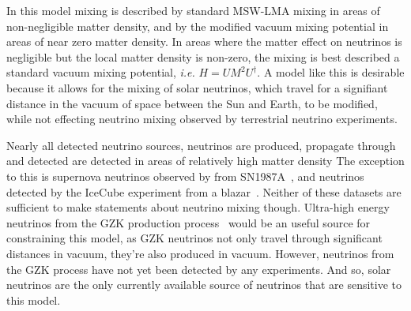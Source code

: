 In this model mixing is described by standard MSW-LMA mixing in areas of
non-negligible matter density, and by the modified vacuum mixing potential
in areas of near zero matter density.
In areas where the matter effect on neutrinos is negligible but the local
matter density is non-zero, the mixing is best described a standard
vacuum mixing potential, \textit{i.e.} $H = UM^{2}U^{\dagger}$.
A model like this is desirable because it allows for the mixing of solar neutrinos, which
travel for a signifiant distance in the vacuum of space between the Sun and Earth,
to be modified, while not effecting neutrino mixing observed by terrestrial neutrino experiments.

Nearly all detected neutrino sources, neutrinos are produced, propagate through
 and detected are detected in areas of relatively high matter density
The exception to this is supernova neutrinos observed by from SN1987A~\citep{kamiokande_sn, imb_sn,baksan_sn},
and neutrinos detected by the IceCube experiment from a blazar~\citep{icecube_blazar}.
Neither of these datasets are sufficient to make statements
about neutrino mixing though.
Ultra-high energy neutrinos from the GZK production process~\citep{gzk} would be an useful
source for constraining this model, as GZK neutrinos not only travel through
significant distances in vacuum, they're also produced in vacuum.
However, neutrinos from the GZK process have not yet been detected by
any experiments.
And so, solar neutrinos are the only currently available source
of neutrinos that are sensitive to this model.

